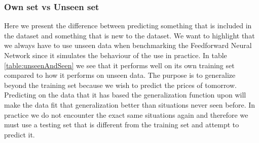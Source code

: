 \subsubsection{Own set vs Unseen set}
Here we present the difference between predicting something that is included in the dataset and something that is new to the dataset. We want to highlight that we always have to use unseen data when benchmarking the Feedforward Neural Network since it simulates the behaviour of the use in practice. In table \ref{table:unseenAndSeen} we see that it performs well on its own training set compared to how it performs on unseen data. The purpose is to generalize beyond the training set because we wish to predict the prices of tomorrow. Predicting on the data that it has based the generalization function upon will make the data fit that generalization better than situations never seen before. In practice we do not encounter the exact same situations again and therefore we must use a testing set that is different from the training set and attempt to predict it. 

